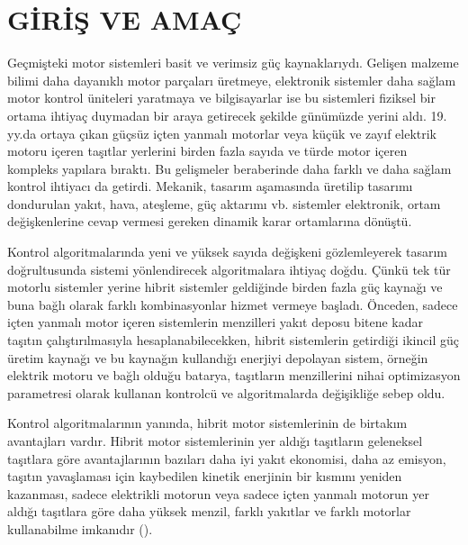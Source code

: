 \chapter{GİRİŞ VE AMAÇ}
\label{girisveamac}

Geçmişteki motor sistemleri basit ve verimsiz güç kaynaklarıydı. Gelişen malzeme bilimi daha dayanıklı motor parçaları üretmeye, elektronik sistemler daha sağlam motor kontrol üniteleri yaratmaya
ve bilgisayarlar ise bu sistemleri fiziksel bir ortama ihtiyaç duymadan bir araya getirecek şekilde günümüzde yerini aldı. 19. yy.da ortaya çıkan güçsüz içten yanmalı motorlar veya küçük
ve zayıf elektrik motoru içeren taşıtlar yerlerini birden fazla sayıda ve türde motor içeren kompleks yapılara bıraktı. Bu gelişmeler beraberinde daha farklı ve daha sağlam kontrol ihtiyacı da 
getirdi. Mekanik, tasarım aşamasında üretilip tasarımı dondurulan yakıt, hava, ateşleme, güç aktarımı vb. sistemler elektronik, ortam değişkenlerine cevap vermesi gereken 
dinamik karar ortamlarına dönüştü. 

Kontrol algoritmalarında yeni ve yüksek sayıda değişkeni gözlemleyerek tasarım doğrultusunda sistemi yönlendirecek algoritmalara ihtiyaç doğdu. Çünkü tek tür motorlu sistemler yerine
hibrit sistemler geldiğinde birden fazla güç kaynağı ve buna bağlı olarak farklı kombinasyonlar hizmet vermeye başladı. Önceden, sadece içten yanmalı motor içeren sistemlerin menzilleri
yakıt deposu bitene kadar taşıtın çalıştırılmasıyla hesaplanabilecekken, hibrit sistemlerin getirdiği ikincil güç üretim kaynağı ve bu kaynağın kullandığı enerjiyi depolayan sistem, örneğin
elektrik motoru ve bağlı olduğu batarya, taşıtların menzillerini nihai optimizasyon parametresi olarak kullanan kontrolcü ve algoritmalarda değişikliğe sebep oldu.

Kontrol algoritmalarının yanında, hibrit motor sistemlerinin de birtakım avantajları vardır. Hibrit motor sistemlerinin yer aldığı taşıtların geleneksel taşıtlara göre
avantajlarının bazıları daha iyi yakıt ekonomisi, daha az emisyon, taşıtın yavaşlaması için kaybedilen kinetik enerjinin bir kısmını yeniden kazanması, sadece elektrikli motorun veya
sadece içten yanmalı motorun yer aldığı taşıtlara göre daha yüksek menzil, farklı yakıtlar ve farklı motorlar kullanabilme imkanıdır (\cite{advofhybrids}).

